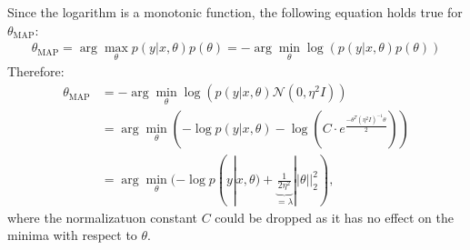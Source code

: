 \begin{answer}
Since the logarithm is a monotonic function, the following equation holds true for $\theta_{\text{MAP}}$:
\begin{align*}
    \theta_{\text{MAP}} = \arg\max_\theta p(y|x, \theta)p(\theta) = -\arg\min_\theta \log\left(p(y|x, \theta)p(\theta)\right)
\end{align*}
Therefore:
\begin{align*}
    \theta_{\text{MAP}} &= - \arg\min_\theta \log\left(p(y|x, \theta)\mathcal{N}(0,\eta^2I)\right) \\
    & = \arg\min_\theta (-\log p(y|x, \theta) - \log(C\cdot e^{\frac{-\theta^T(\eta^2 I)^{-1}\theta}{2}})) \\
    & = \arg\min_\theta (-\log p(y|x, \theta) + \underbrace{\frac{1}{2\eta^2}}_{=\lambda}||\theta||^2_2),
  \end{align*}
  where the normalizatuon constant $C$ could be dropped as it has no effect on the minima with respect to $\theta$.
\end{answer}

